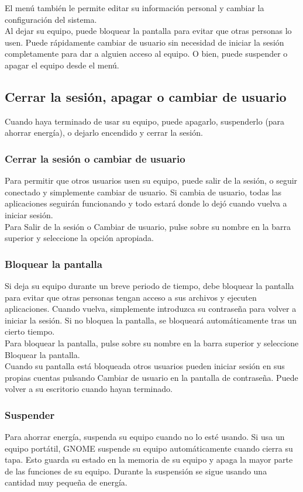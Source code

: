 El menú también le permite editar su información personal y cambiar la configuración del sistema.\\

Al dejar su equipo, puede bloquear la pantalla para evitar que otras personas lo usen. Puede rápidamente cambiar de usuario sin necesidad de iniciar la sesión completamente para dar a alguien acceso al equipo. O bien, puede suspender o apagar el equipo desde el menú.
\subsection{Cerrar la sesión, apagar o cambiar de usuario}
Cuando haya terminado de usar su equipo, puede apagarlo, suspenderlo (para ahorrar energía), o dejarlo encendido y cerrar la sesión.
\subsubsection{Cerrar la sesión o cambiar de usuario}
Para permitir que otros usuarios usen su equipo, puede salir de la sesión, o seguir conectado y simplemente cambiar de usuario. Si cambia de usuario, todas las aplicaciones seguirán funcionando y todo estará donde lo dejó cuando vuelva a iniciar sesión.\\
Para Salir de la sesión o Cambiar de usuario, pulse sobre su nombre en la barra superior y seleccione la opción apropiada.
\subsubsection{Bloquear la pantalla}
Si deja su equipo durante un breve periodo de tiempo, debe bloquear la pantalla para evitar que otras personas tengan acceso a sus archivos y ejecuten aplicaciones. Cuando vuelva, simplemente introduzca su contraseña para volver a iniciar la sesión. Si no bloquea la pantalla, se bloqueará automáticamente tras un cierto tiempo.\\

Para bloquear la pantalla, pulse sobre su nombre en la barra superior y seleccione Bloquear la pantalla.\\

Cuando su pantalla está bloqueada otros usuarios pueden iniciar sesión en sus propias cuentas pulsando Cambiar de usuario en la pantalla de contraseña. Puede volver a su escritorio cuando hayan terminado.
\subsubsection{Suspender}
Para ahorrar energía, suspenda su equipo cuando no lo esté usando. Si usa un equipo portátil, GNOME suspende su equipo automáticamente cuando cierra su tapa. Esto guarda su estado en la memoria de su equipo y apaga la mayor parte de las funciones de su equipo. Durante la suspensión se sigue usando una cantidad muy pequeña de energía.\\

